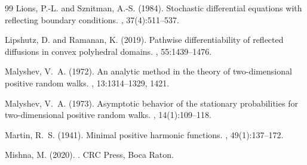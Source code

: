 \documentclass[11pt]{article}
\theoremstyle{definition}
\begin{document}
\begin{thebibliography}{99}
Lions, P.-L. and Sznitman, A.-S. (1984).
\newblock Stochastic differential equations with reflecting boundary conditions.
, 37(4):511--537.

Lipshutz, D. and Ramanan, K. (2019).
\newblock Pathwise differentiability of reflected diffusions in convex
  polyhedral domains.
, 55:1439--1476.


Malyshev, V.~A. (1972).
\newblock An analytic method in the theory of two-dimensional positive random
  walks.
, 13:1314--1329, 1421.

Malyshev, V.~A. (1973).
\newblock Asymptotic behavior of the stationary probabilities for
  two-dimensional positive random walks.
, 14(1):109--118.

Martin, R.~S. (1941).
\newblock Minimal positive harmonic functions.
,
  49(1):137--172.

Mishna, M. (2020).
.
\newblock CRC Press, Boca Raton.





\end{thebibliography}
\end{document}

